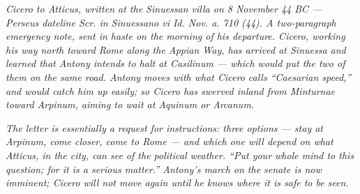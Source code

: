 
\textit{Cicero to Atticus, written at the Sinuessan villa on
8 November 44 BC --- Perseus dateline \textit{Scr. in
Sinuessano vi Id. Nov. a. 710 (44)}. A two-paragraph
emergency note, sent in haste on the morning of his
departure. Cicero, working his way north toward Rome along
the Appian Way, has arrived at Sinuessa and learned that
Antony intends to halt at Casilinum --- which would put the
two of them on the same road. Antony moves with what Cicero
calls ``Caesarian speed,'' and would catch him up easily; so
Cicero has swerved inland from Minturnae toward Arpinum,
aiming to wait at Aquinum or Arcanum.}

\textit{The letter is essentially a request for instructions:
three options --- stay at Arpinum, come closer, come to Rome
--- and which one will depend on what Atticus, in the city,
can see of the political weather. ``Put your whole mind to
this question; for it is a serious matter.'' Antony's march
on the senate is now imminent; Cicero will not move again
until he knows where it is safe to be seen.}
